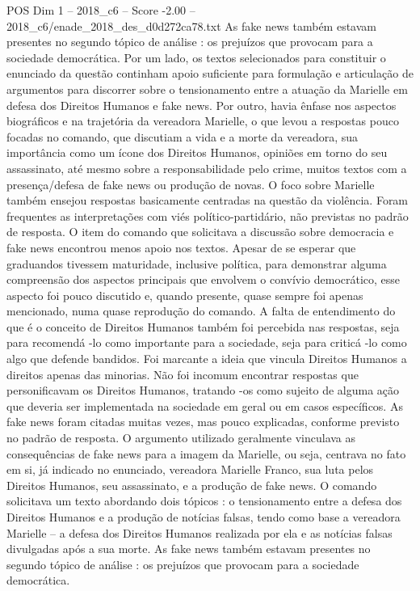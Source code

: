 \begin{textsample}{POS Dim 1 – 2018\_c6 – Score -2.00 – 2018\_c6/enade\_2018\_des\_d0d272ca78.txt}
As fake news também estavam presentes no segundo tópico de análise : os prejuízos que provocam para a sociedade democrática.
Por um lado, os textos selecionados para constituir o enunciado da questão continham apoio suficiente para formulação e articulação de argumentos para discorrer sobre o tensionamento entre a atuação da Marielle em defesa dos Direitos Humanos e fake news.
Por outro, havia ênfase nos aspectos biográficos e na trajetória da vereadora Marielle, o que levou a respostas pouco focadas no comando, que discutiam a vida e a morte da vereadora, sua importância como um ícone dos Direitos Humanos, opiniões em torno do seu assassinato, até mesmo sobre a responsabilidade pelo crime, muitos textos com a presença/defesa de fake news ou produção de novas.
O foco sobre Marielle também ensejou respostas basicamente centradas na questão da violência.
Foram frequentes as interpretações com viés político-partidário, não previstas no padrão de resposta.
O item do comando que solicitava a discussão sobre democracia e fake news encontrou menos apoio nos textos.
Apesar de se esperar que graduandos tivessem maturidade, inclusive política, para demonstrar alguma compreensão dos aspectos principais que envolvem o convívio democrático, esse aspecto foi pouco discutido e, quando presente, quase sempre foi apenas mencionado, numa quase reprodução do comando.
A falta de entendimento do que é o conceito de Direitos Humanos também foi percebida nas respostas, seja para recomendá -lo como importante para a sociedade, seja para criticá -lo como algo que defende bandidos.
Foi marcante a ideia que vincula Direitos Humanos a direitos apenas das minorias.
Não foi incomum encontrar respostas que personificavam os Direitos Humanos, tratando -os como sujeito de alguma ação que deveria ser implementada na sociedade em geral ou em casos específicos.
As fake news foram citadas muitas vezes, mas pouco explicadas, conforme previsto no padrão de resposta.
O argumento utilizado geralmente vinculava as consequências de fake news para a imagem da Marielle, ou seja, centrava no fato em si, já indicado no enunciado, vereadora Marielle Franco, sua luta pelos Direitos Humanos, seu assassinato, e a produção de fake news.
O comando solicitava um texto abordando dois tópicos : o tensionamento entre a defesa dos Direitos Humanos e a produção de notícias falsas, tendo como base a vereadora Marielle – a defesa dos Direitos Humanos realizada por ela e as notícias falsas divulgadas após a sua morte.
As fake news também estavam presentes no segundo tópico de análise : os prejuízos que provocam para a sociedade democrática.

\end{textsample}
